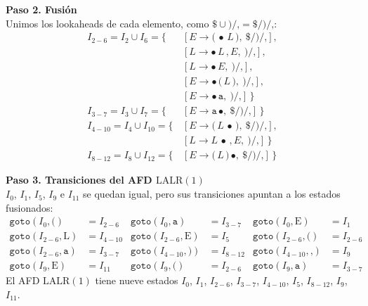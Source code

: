 \documentclass[12pt,letterpaper]{article}
\newcommand{\nt}[1]{\textit{#1}}
\newcommand{\tk}[1]{\texttt{#1}}
\newcommand{\tx}[1]{\text{#1}}
\newcommand{\lalr}{\mathrm{LALR(1)}}
\begin{document}
\begin{enumerate}[label=\arabic*.]
  \textbf{Paso 2. Fusión}\\
  Unimos los lookaheads de cada elemento, como $\tk{\$}\cup\tk{)}/\tk{,}=\tk{\$}/\tk{)}/\tk{,}$:
  \[
  \begin{aligned}
    I_{2-6} = I_2 \cup I_6 = \{\, & [\nt{E}\to\tk{(}\,\bullet\,\nt{L}\,\tk{)},\ \tk{\$}/\tk{)}/\tk{,}],\\
                                 & [\nt{L}\to\bullet\,\nt{L}\,\tk{,}\,\nt{E},\ \tk{)}/\tk{,}],\\
                                 & [\nt{L}\to\bullet\,\nt{E},\ \tk{)}/\tk{,}],\\
                                 & [\nt{E}\to\bullet\,\tk{(}\,\nt{L}\,\tk{)},\ \tk{)}/\tk{,}],\\
                                 & [\nt{E}\to\bullet\,\tk{a},\ \tk{)}/\tk{,}]\,\}\\[6pt]
    I_{3-7} = I_3 \cup I_7 = \{\, & [\nt{E}\to\tk{a}\,\bullet,\ \tk{\$}/\tk{)}/\tk{,}]\,\}\\[6pt]
    I_{4-10} = I_4 \cup I_{10} = \{\, & [\nt{E}\to\tk{(}\,\nt{L}\,\bullet\,\tk{)},\ \tk{\$}/\tk{)}/\tk{,}],\\
                                     & [\nt{L}\to\nt{L}\,\bullet\,\tk{,}\,\nt{E},\ \tk{)}/\tk{,}]\,\}\\[6pt]
    I_{8-12} = I_8 \cup I_{12} = \{\, & [\nt{E}\to\tk{(}\,\nt{L}\,\tk{)}\,\bullet,\ \tk{\$}/\tk{)}/\tk{,}]\,\}
  \end{aligned}
  \]

  \textbf{Paso 3. Transiciones del AFD $\lalr$}\\
  $I_0$, $I_1$, $I_5$, $I_9$ e $I_{11}$ se quedan igual, pero sus transiciones apuntan a los estados fusionados:
  \[
  \begin{aligned}
    \texttt{goto}(I_0,\tk{(}) &= \boxed{I_{2-6}} & \texttt{goto}(I_0,\tk{a}) &= \boxed{I_{3-7}} & \texttt{goto}(I_0,\tx{E}) &= I_1\\[3pt]
    \texttt{goto}(I_{2-6},\tx{L}) &= \boxed{I_{4-10}} & \texttt{goto}(I_{2-6},\tx{E}) &= I_5 & \texttt{goto}(I_{2-6},\tk{(}) &= I_{2-6}\\[3pt]
    \texttt{goto}(I_{2-6},\tk{a}) &= I_{3-7} & \texttt{goto}(I_{4-10},\tk{)}) &= \boxed{I_{8-12}} & \texttt{goto}(I_{4-10},\tk{,}) &= I_9\\[3pt]
    \texttt{goto}(I_9,\tx{E}) &= I_{11} & \texttt{goto}(I_9,\tk{(}) &= I_{2-6} & \texttt{goto}(I_9,\tk{a}) &= I_{3-7}
  \end{aligned}
  \]
  El AFD $\lalr$ tiene nueve estados
  $I_0$, $I_1$, $I_{2-6}$, $I_{3-7}$, $I_{4-10}$, $I_5$, $I_{8-12}$, $I_9$, $I_{11}$.\\
  

\end{enumerate}
\end{document}
